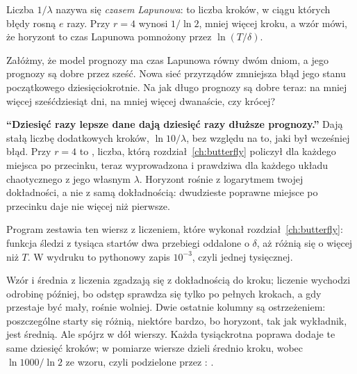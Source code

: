 Liczba $1/\lambda$ nazywa się \emph{czasem Lapunowa}: to liczba kroków, w
ciągu których błędy rosną $e$ razy. Przy $r = 4$ wynosi $1/\ln 2$, mniej
więcej  kroku, a wzór mówi, że horyzont to czas Lapunowa
pomnożony przez $\ln(T/\delta)$.


\begin{think}
Załóżmy, że model prognozy ma czas Lapunowa równy dwóm dniom, a jego
prognozy są dobre przez sześć. Nowa sieć przyrządów zmniejsza błąd jego
stanu początkowego dziesięciokrotnie. Na jak długo prognozy są dobre teraz:
na mniej więcej sześćdziesiąt dni, na mniej więcej dwanaście, czy krócej?
\end{think}

\begin{trapbox}
\textbf{\enquote{Dziesięć razy lepsze dane dają dziesięć razy dłuższe
prognozy.}} Dają stałą liczbę dodatkowych kroków, $\ln 10/\lambda$, bez
względu na to, jaki był wcześniej błąd. Przy $r = 4$ to ,
liczba, którą rozdział~\ref{ch:butterfly} policzył dla każdego miejsca po
przecinku, teraz wyprowadzona i prawdziwa dla każdego układu chaotycznego z
jego własnym $\lambda$. Horyzont rośnie z logarytmem twojej dokładności, a
nie z samą dokładnością: dwudzieste poprawne miejsce po przecinku daje nie
więcej niż pierwsze.
\end{trapbox}


\noindent
Program zestawia ten wiersz z liczeniem, które wykonał
rozdział~\ref{ch:butterfly}: funkcja  śledzi z tysiąca startów
dwa przebiegi oddalone o $\delta$, aż różnią się o więcej niż $T$. W
wydruku  to pythonowy zapis $10^{-3}$, czyli jednej
tysięcznej.



\noindent
Wzór i średnia z liczenia zgadzają się z dokładnością do kroku; liczenie
wychodzi odrobinę później, bo odstęp sprawdza się tylko po pełnych krokach,
a gdy przestaje być mały, rośnie wolniej. Dwie ostatnie kolumny są
ostrzeżeniem: poszczególne starty się różnią, niektóre bardzo, bo horyzont,
tak jak wykładnik, jest średnią. Ale spójrz w dół wierszy. Każda tysiąckrotna
poprawa dodaje te same dziesięć kroków; w pomiarze wiersze dzieli średnio
 kroku, wobec $\ln 1000/\ln 2$ ze wzoru, czyli
 podzielone przez :
.

